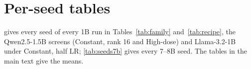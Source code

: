 \documentclass{article}
\begin{document}
\FloatBarrier
\section{Per-seed tables}
\label{app:seeds}

 gives every seed of every 1B run in
Tables~\ref{tab:family} and~\ref{tab:recipe}, the
Qwen2.5-1.5B screens (Constant, rank 16 and High-dose) and Llama-3.2-1B under
Constant, half LR; \cref{tab:seeds7b} gives every 7--8B seed. The tables in
the main text give the means.
\end{document}
